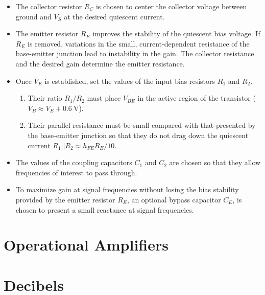 \documentclass[11pt]{article}
\begin{document}
\begin{itemize}
\item The collector resistor $R_C$ is chosen to center the collector
  voltage between ground and $V_S$ at the desired quiescent current.

\item The emitter resistor $R_E$ improves the stability of the
  quiescent bias voltage. If $R_E$ is removed, variations in the small,
  current-dependent resistance of the base-emitter junction lead to
  instability in the gain. The collector resistance and the desired
  gain determine the emitter resistance. 

\item Once $V_E$ is established, set the values of the input bias
  resistors $R_1$ and $R_2$.
  \begin{enumerate}
  \item Their ratio $R_1/R_2$ must place $V_{BE}$ in the active region
    of the transistor ($V_B \approx V_E + 0.6~\mathrm{V}$).

  \item Their parallel resistance must be small compared with that
    presented by the base-emitter junction so that they do not drag 
    down the quiescent current $R_1 || R_2 \approx h_{FE} R_E/ 10$. 
  \end{enumerate}

\item The values of the coupling capacitors $C_1$ and $C_2$ are chosen
  so that they allow frequencies of interest to pass through.

\item To maximize gain at signal frequencies without losing the bias
  stability provided by the emitter resistor $R_E$, an optional bypass
  capacitor $C_E$, is chosen to present a small reactance at signal
  frequencies.
\end{itemize}

\section{Operational Amplifiers}
\label{sec:opamps}


\newpage
\appendix

\section{Decibels}
\end{document}
